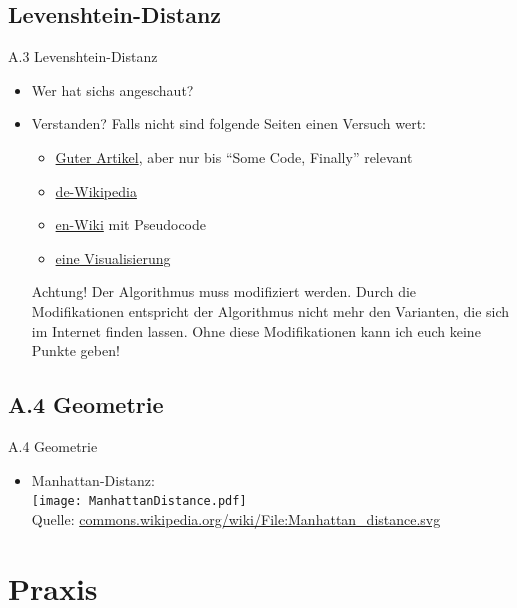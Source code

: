 \documentclass[usepdftitle=false,hyperref={pdfpagelabels=false}]{beamer}
\begin{document}
\subsection{Levenshtein-Distanz}
\begin{frame}{A.3 Levenshtein-Distanz}
  \begin{itemize}[<+->]
    \item Wer hat sichs angeschaut?
    \item Verstanden? Falls nicht sind folgende Seiten einen Versuch wert:
    \begin{itemize}
        \item \href{http://oldfashionedsoftware.com/tag/levenshtein-distance/}{Guter Artikel}, aber nur bis "`Some Code, Finally"' relevant
        \item \href{http://de.wikipedia.org/wiki/Levenshtein-Distanz}{de-Wikipedia}
        \item \href{http://en.wikipedia.org/wiki/Levenshtein_Distance\#Computing_Levenshtein_distance}{en-Wiki} mit Pseudocode
        \item \href{http://www-igm.univ-mlv.fr/~lecroq/seqcomp/node2.html}{eine Visualisierung}
    \end{itemize}
    \begin{alertblock}{Achtung!}
      Der Algorithmus muss modifiziert werden. Durch die Modifikationen entspricht
      der Algorithmus nicht mehr den Varianten, die sich im Internet finden lassen. 
      Ohne diese Modifikationen kann ich euch keine Punkte geben!
    \end{alertblock}
  \end{itemize}
\end{frame}

\subsection{A.4 Geometrie}
\begin{frame}{A.4 Geometrie}
  \begin{itemize}[<+->]
    \item Manhattan-Distanz:\\
        \texttt{[image: ManhattanDistance.pdf]}\\
        \tiny{Quelle: \href{http://commons.wikimedia.org/wiki/File:Manhattan\_distance.svg}{commons.wikipedia.org/wiki/File:Manhattan\_distance.svg}}
  \end{itemize}
\end{frame}

\section{Praxis}
\end{document}
